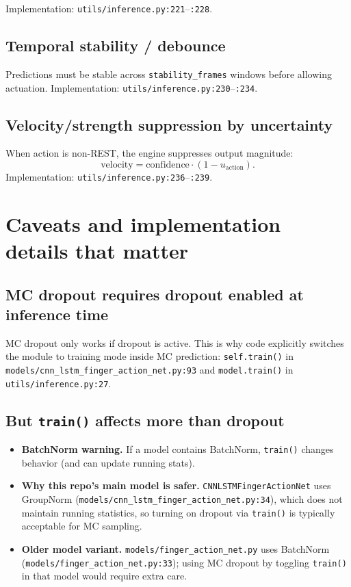 \documentclass[11pt]{article}
\begin{document}
Implementation: \texttt{utils/inference.py:221}--\texttt{:228}.

\subsection{Temporal stability / debounce}
Predictions must be stable across \texttt{stability\_frames} windows before allowing actuation.
Implementation: \texttt{utils/inference.py:230}--\texttt{:234}.

\subsection{Velocity/strength suppression by uncertainty}
When action is non-REST, the engine suppresses output magnitude:
\[
\mathrm{velocity}=\mathrm{confidence}\cdot(1-u_{\text{action}}).
\]
Implementation: \texttt{utils/inference.py:236}--\texttt{:239}.

\section{Caveats and implementation details that matter}

\subsection{MC dropout requires dropout enabled at inference time}
MC dropout only works if dropout is active.
This is why code explicitly switches the module to training mode inside MC prediction:
\texttt{self.train()} in \texttt{models/cnn\_lstm\_finger\_action\_net.py:93} and
\texttt{model.train()} in \texttt{utils/inference.py:27}.

\subsection{But \texttt{train()} affects more than dropout}
\begin{itemize}
  \item \textbf{BatchNorm warning.} If a model contains BatchNorm, \texttt{train()} changes behavior (and can update running stats).
  \item \textbf{Why this repo's main model is safer.} \texttt{CNNLSTMFingerActionNet} uses GroupNorm (\texttt{models/cnn\_lstm\_finger\_action\_net.py:34}), which does not maintain running statistics, so turning on dropout via \texttt{train()} is typically acceptable for MC sampling.
  \item \textbf{Older model variant.} \texttt{models/finger\_action\_net.py} uses BatchNorm (\texttt{models/finger\_action\_net.py:33}); using MC dropout by toggling \texttt{train()} in that model would require extra care.
\end{itemize}
\end{document}
